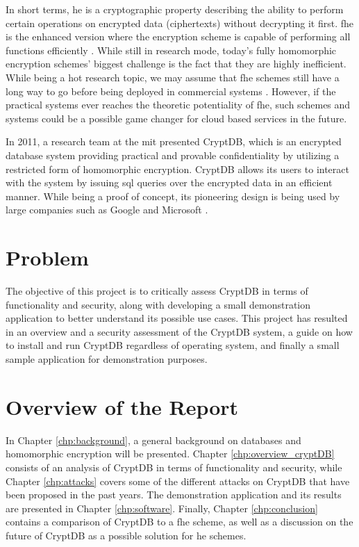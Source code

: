 In short terms, \gls{he} is a cryptographic property describing the ability to perform certain operations on encrypted data (ciphertexts) without decrypting it first. \gls{fhe} is the enhanced version where the encryption scheme is capable of performing all functions efficiently \cite{Gentry_thesis}. While still in research mode, today's fully homomorphic encryption schemes' biggest challenge is the fact that they are highly inefficient. While being a hot research topic, we may assume that \gls{fhe} schemes still have a long way to go before being deployed in commercial systems \cite{naehrig2011can}. However, if the practical systems ever reaches the theoretic potentiality of \gls{fhe}, such schemes and systems could be a possible game changer for cloud based services in the future.

In 2011, a research team at the \gls{mit} presented CryptDB, which is an encrypted database system providing practical and provable confidentiality by utilizing a restricted form of homomorphic encryption\cite{CryptDB_Main_Paper}. CryptDB allows its users to interact with the system by issuing \gls{sql} queries over the encrypted data in an efficient manner. While being a proof of concept, its pioneering design is being used by large companies such as Google and Microsoft \cite{cryptdb_homepage}.

\section{Problem}

The objective of this project is to critically assess CryptDB in terms of functionality and security, along with developing a small demonstration application to better understand its possible use cases. This project has resulted in an overview and a security assessment of the CryptDB system, a guide on how to install and run CryptDB regardless of operating system, and finally a small sample application for demonstration purposes.

\section{Overview of the Report}

In Chapter \ref{chp:background}, a general background on databases and homomorphic encryption will be presented. Chapter \ref{chp:overview_cryptDB} consists of an analysis of CryptDB in terms of functionality and security, while Chapter \ref{chp:attacks} covers some of the different attacks on CryptDB that have been proposed in the past years. The demonstration application and its results are presented in Chapter \ref{chp:software}. Finally, Chapter \ref{chp:conclusion} contains a comparison of CryptDB to a \gls{fhe} scheme, as well as a discussion on the future of CryptDB as a possible solution for \gls{he} schemes.